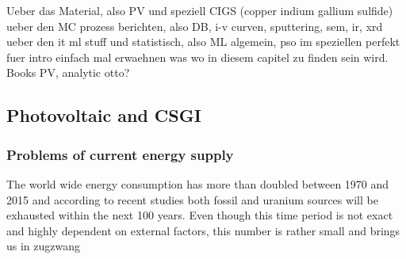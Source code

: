 Ueber das Material, also PV und speziell CIGS (copper indium gallium sulfide) 
ueber den MC prozess berichten, also DB, i-v curven, sputtering, sem, ir, xrd
ueber den it ml stuff und statistisch, also ML algemein, pso im speziellen 
perfekt fuer intro einfach mal erwaehnen was wo in diesem capitel zu finden sein wird. 
Books PV, analytic otto? 
\subsection{Photovoltaic and CSGI}
\iffalse
The grundlage for all pvs is the photovoltaik effect which was entdeckt by Albert Einstein adn for which he got the nobel price. 
The Prinziple is easy: When the energy (E = hv) of the light is \td{large,strong,big,high}er than the binding energy of an electron the electron is ejected with the remaining energy as kinetic energy 
\begin{math}
	E_{kin}=hv - Eb
\end{math}
Different Materials have different binding energies. Metalls do have in general lower binding energies than covalent bound material and halbleiter do have even lowers E_b. 
Thats Silica is in a lot of PVs. 
The next generation of PVs. 
CIGS has in contrast to silicium based PV a direct band gap\td{source and what does that mean?}
duennschicht pv, haben eine effeftivitaet von 7-16\% vs 15-22\% \cite{Mertens2018}
\fi
\subsubsection{Problems of current energy supply}
The world wide energy consumption has more than doubled between 1970 and 2015\cite{BP2017} and according to recent studies both fossil\cite{BGR2017} and uranium sources\cite{Uran2006} 
will be exhausted within the next 100 years. 
Even though this time period is not exact and highly dependent on external factors, this number is rather small and brings us in zugzwang

